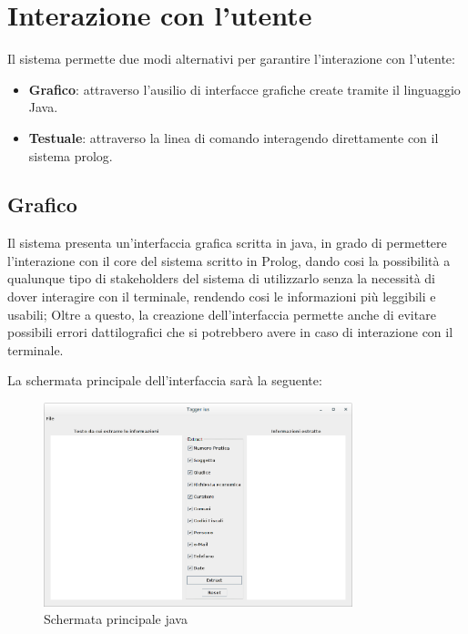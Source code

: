 
\section{Interazione con l'utente}
\label{Interaction}
Il sistema permette due modi alternativi per garantire l'interazione con l'utente:
\begin{itemize}
	\item \textbf{Grafico}: attraverso l'ausilio di interfacce grafiche create tramite il linguaggio Java.
	\item \textbf{Testuale}: attraverso la linea di comando interagendo direttamente con il sistema prolog.
\end{itemize}
\subsection{Grafico}
Il sistema presenta un'interfaccia grafica scritta in java, in grado di permettere l'interazione con il core del sistema scritto in Prolog, dando cosi la possibilità a qualunque tipo di stakeholders del sistema di utilizzarlo senza la necessità di dover interagire con il terminale, rendendo cosi le informazioni più leggibili e usabili; Oltre a questo, la creazione dell'interfaccia permette anche di evitare possibili errori dattilografici che si potrebbero avere in caso di interazione con il terminale.

La schermata principale dell'interfaccia sarà la seguente:
\begin{figure}[H]
	\centering
	\includegraphics[width=0.8\textwidth]{img/interfaces/java-main.png}
	\caption[Schermata java main]{Schermata principale java}
	\label{java-main}
\end{figure}

